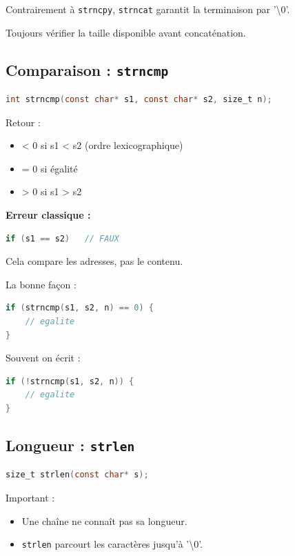 Contrairement à \texttt{strncpy},
\texttt{strncat} garantit la terminaison par '\textbackslash 0'.

Toujours vérifier la taille disponible avant concaténation.

\subsection{Comparaison : \texttt{strncmp}}

\begin{lstlisting}[language=C]
int strncmp(const char* s1, const char* s2, size_t n);
\end{lstlisting}

Retour :

\begin{itemize}
    \item < 0 si s1 < s2 (ordre lexicographique)
    \item = 0 si égalité
    \item > 0 si s1 > s2
\end{itemize}

\textbf{Erreur classique :}

\begin{lstlisting}[language=C]
if (s1 == s2)   // FAUX
\end{lstlisting}

Cela compare les adresses,
pas le contenu.

La bonne façon :

\begin{lstlisting}[language=C]
if (strncmp(s1, s2, n) == 0) {
    // egalite
}
\end{lstlisting}

Souvent on écrit :

\begin{lstlisting}[language=C]
if (!strncmp(s1, s2, n)) {
    // egalite
}
\end{lstlisting}

\subsection{Longueur : \texttt{strlen}}

\begin{lstlisting}[language=C]
size_t strlen(const char* s);
\end{lstlisting}

Important :

\begin{itemize}
    \item Une chaîne ne connaît pas sa longueur.
    \item \texttt{strlen} parcourt les caractères jusqu’à '\textbackslash 0'.
\end{itemize}

